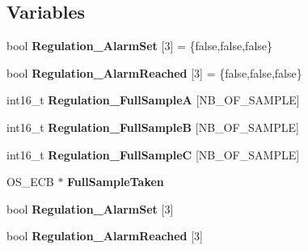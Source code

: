 \subsection*{Variables}
\begin{DoxyCompactItemize}
\item 
\hypertarget{group___regulation__module_ga8aae7cd1cc9dc9ba8cdd97b5a4cc7033}{}bool {\bfseries Regulation\+\_\+\+Alarm\+Set} \mbox{[}3\mbox{]} = \{false,false,false\}\label{group___regulation__module_ga8aae7cd1cc9dc9ba8cdd97b5a4cc7033}

\item 
\hypertarget{group___regulation__module_gafd77dc132fa8aed0354fd60317064bfa}{}bool {\bfseries Regulation\+\_\+\+Alarm\+Reached} \mbox{[}3\mbox{]} = \{false,false,false\}\label{group___regulation__module_gafd77dc132fa8aed0354fd60317064bfa}

\item 
\hypertarget{group___regulation__module_gaca8446a5b4993285eaebecdc4aac5767}{}int16\+\_\+t {\bfseries Regulation\+\_\+\+Full\+Sample\+A} \mbox{[}N\+B\+\_\+\+O\+F\+\_\+\+S\+A\+M\+P\+L\+E\mbox{]}\label{group___regulation__module_gaca8446a5b4993285eaebecdc4aac5767}

\item 
\hypertarget{group___regulation__module_gaee80c31edce76d7310e64bb28d24cc40}{}int16\+\_\+t {\bfseries Regulation\+\_\+\+Full\+Sample\+B} \mbox{[}N\+B\+\_\+\+O\+F\+\_\+\+S\+A\+M\+P\+L\+E\mbox{]}\label{group___regulation__module_gaee80c31edce76d7310e64bb28d24cc40}

\item 
\hypertarget{group___regulation__module_ga90cf29f5dc7c877d9b4de61068bfa7ed}{}int16\+\_\+t {\bfseries Regulation\+\_\+\+Full\+Sample\+C} \mbox{[}N\+B\+\_\+\+O\+F\+\_\+\+S\+A\+M\+P\+L\+E\mbox{]}\label{group___regulation__module_ga90cf29f5dc7c877d9b4de61068bfa7ed}

\item 
\hypertarget{group___regulation__module_ga65eb073a4239a77c443ed61dcbfb330b}{}O\+S\+\_\+\+E\+C\+B $\ast$ {\bfseries Full\+Sample\+Taken}\label{group___regulation__module_ga65eb073a4239a77c443ed61dcbfb330b}

\item 
\hypertarget{group___regulation__module_ga8aae7cd1cc9dc9ba8cdd97b5a4cc7033}{}bool {\bfseries Regulation\+\_\+\+Alarm\+Set} \mbox{[}3\mbox{]}\label{group___regulation__module_ga8aae7cd1cc9dc9ba8cdd97b5a4cc7033}

\item 
\hypertarget{group___regulation__module_gafd77dc132fa8aed0354fd60317064bfa}{}bool {\bfseries Regulation\+\_\+\+Alarm\+Reached} \mbox{[}3\mbox{]}\label{group___regulation__module_gafd77dc132fa8aed0354fd60317064bfa}

\end{DoxyCompactItemize}


